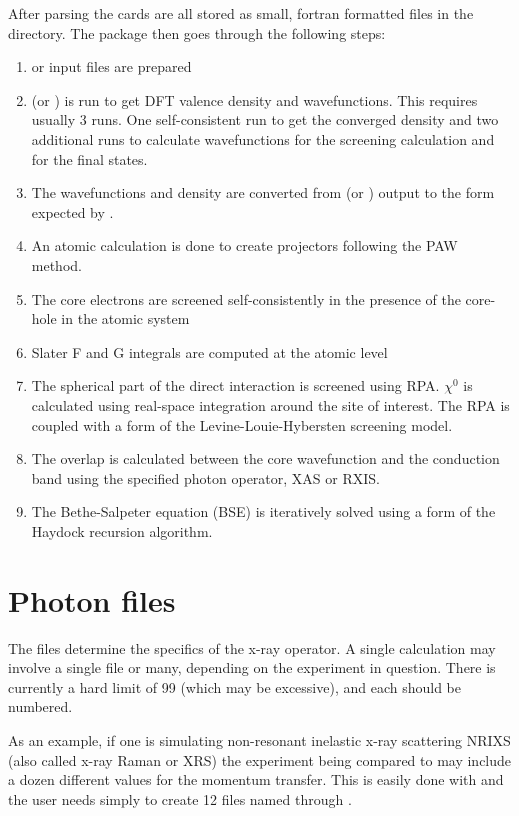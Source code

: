 \documentclass[11pt]{report}
\begin{document}
After parsing the cards are all stored as small, fortran formatted files in the  directory. The package then goes through the following steps:
\begin{enumerate}
\item {} or  input files are prepared
\item {} (or ) is run to get DFT valence density and wavefunctions. This requires usually 3 runs. One self-consistent run to get the converged density and two additional runs to calculate wavefunctions for the screening calculation and for the final states.
\item The wavefunctions and density are converted from  (or )  output to the form expected by \OCEAN{}.
\item An atomic calculation is done to create projectors following the PAW method.
\item The core electrons are screened self-consistently in the presence of the core-hole in the atomic system
\item Slater F and G integrals are computed at the atomic level
\item The spherical part of the direct interaction is screened using RPA. $\chi^0$ is calculated using real-space integration around the site of interest. The RPA is coupled with a form of the Levine-Louie-Hybersten screening model.
\item The overlap is calculated between the core wavefunction and the conduction band using the specified photon operator, XAS or RXIS.
\item The Bethe-Salpeter equation (BSE) is iteratively solved using a form of the Haydock recursion algorithm.
\end{enumerate}

\section{Photon files}
\label{photon_files}
The  files determine the specifics of the x-ray operator. A single \OCEAN{} calculation may involve a single  file or many, depending on the experiment in question. There is currently a hard limit of 99 (which may be excessive), and each should be numbered. 

As an example, if one is simulating non-resonant inelastic x-ray scattering NRIXS (also called x-ray Raman or XRS) the experiment being compared to may include a dozen different values for the momentum transfer. This is easily done with \OCEAN{} and the user needs simply to create 12 files named  through .  
\end{document}
